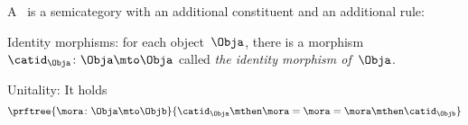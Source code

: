 



%
%
\begin{ctdefinition}[Category]
    \label{def:categorymain}
    A \emph{}~\CatC is a semicategory with an additional constituent and an additional rule:
    \begin{body}
        \constit
        \begin{compactenum}
            \item Identity morphisms: for each object~$\Obja$, there is
            a morphism~$\catid_{\Obja}\colon \Obja \mto \Obja$  called \emph{the identity
            morphism of~$\Obja$}.
        \end{compactenum}
        \condit
        \begin{compactenum}
            \item Unitality: It holds
            \begin{equation}
                \prftree{\mora \colon \Obja \mto \Objb}{\catid_\Obja \mthen \mora= \mora = \mora \mthen \catid_\Objb}
            \end{equation}
        \end{compactenum}
    \end{body}
\end{ctdefinition}


